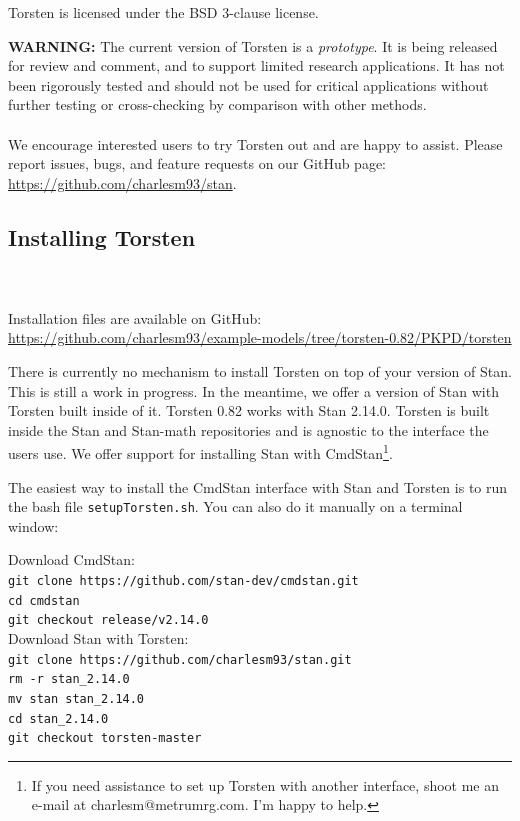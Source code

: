 \documentclass[11pt]{amsart}
\newenvironment{fmpage}[1]
     {\begin{lrbox}{\fmbox}\begin{minipage}{#1}}
     {\end{minipage}\end{lrbox}\fbox{\usebox{\fmbox}}}
\begin{document}
Torsten is licensed under the BSD 3-clause license.

\begin{fmpage}{\textwidth}
{\bf WARNING:} The current version of Torsten is a {\em prototype}. It is being released for review and comment, and to support limited research applications. It has not been rigorously tested and should not be used for critical applications without further testing or cross-checking by comparison with other methods. \\ \ \\
We encourage interested users to try Torsten out and are happy to assist. Please report issues, bugs, and feature requests on our GitHub page: \url{https://github.com/charlesm93/stan}.
\end{fmpage}

\subsection{Installing Torsten}  \ \\ \ \\  
Installation files are available on GitHub: \url{https://github.com/charlesm93/example-models/tree/torsten-0.82/PKPD/torsten}

There is currently no mechanism to install Torsten on top of your version of Stan. This is still a work in progress. In the meantime, we offer a version of Stan with Torsten built inside of it. Torsten 0.82 works with Stan 2.14.0. Torsten is built inside the Stan and Stan-math repositories and is agnostic to the interface the users use. We offer support for installing Stan with CmdStan\footnote{If you need assistance to set up Torsten with another interface, shoot me an e-mail at charlesm@metrumrg.com. I'm happy to help.}.

The easiest way to install the CmdStan interface with Stan and Torsten is to run the bash file \texttt{setupTorsten.sh}. You can also do it manually on a terminal window:

Download CmdStan: \\
\texttt{git clone https://github.com/stan-dev/cmdstan.git \\
cd cmdstan \\
git checkout release/v2.14.0
} \\

Download Stan with Torsten: \\
\texttt{git clone https://github.com/charlesm93/stan.git \\
rm -r stan\_2.14.0 \\
mv stan stan\_2.14.0 \\
cd stan\_2.14.0 \\
git checkout torsten-master
} \\
\end{document}
